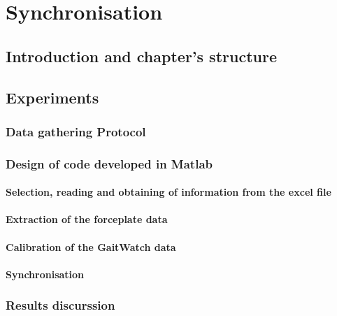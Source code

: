 \chapter{Synchronisation}
\label{ch:Synchronisation}

\section{Introduction and chapter's structure}

\section{Experiments}

	\subsection{Data gathering Protocol}
	\subsection{Design of code developed in Matlab}
	\subsubsection{Selection, reading and obtaining of information from the excel file}
	\subsubsection{Extraction of the forceplate data}
	\subsubsection{Calibration of the GaitWatch data}
	\subsubsection{Synchronisation}	
	\subsection{Results discurssion}